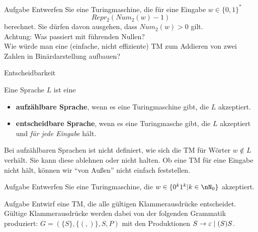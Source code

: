 \begin{frame}{Aufgabe}
	Entwerfen Sie eine Turingmaschine, die für eine Eingabe $w \in \{0, 1\}^*$ $$Repr_2(Num_2(w) - 1)$$ berechnet. Sie dürfen davon ausgehen, dass $Num_2(w) > 0$ gilt.\\
	\pause
	Achtung: Was passiert mit führenden Nullen?\\
	
	\bigskip
	Wie würde man eine (einfache, nicht effiziente) TM zum Addieren von zwei Zahlen in Binärdarstellung aufbauen?
\end{frame}


\begin{frame}{Entscheidbarkeit}
	\begin{Definition}
		Eine Sprache $L$ ist eine   
		\begin{itemize}[<+->]
			\item \textbf{aufzählbare Sprache}, wenn es eine Turingmaschine gibt, die $L$ akzeptiert.
			\item \textbf{entscheidbare Sprache}, wenn es eine Turingmasche gibt, die $L$ akzeptiert und \emph{für jede Eingabe} hält.
		\end{itemize}
	\end{Definition} \pause
	
	Bei aufzählbaren Sprachen ist nicht definiert, wie sich die TM für Wörter $ w \notin L$ verhält. Sie kann diese ablehnen oder nicht halten. Ob eine TM für eine Eingabe nicht hält, können wir \enquote{von Außen} nicht einfach feststellen.
\end{frame}


\begin{frame}{Aufgabe}
	Entwerfen Sie eine Turingmaschine, die $w\in \{0^k1^k | k\in \nN_0 \} $ akzeptiert. 
\end{frame}

\begin{frame}{Aufgabe}
	Entwirf eine TM, die alle gültigen Klammerausdrücke entscheidet.\\
	Gültige Klammerausdrücke werden dabei von der folgenden Grammatik produziert: $ G = (\{S\},\{(, )\}, S, P )$ mit den Produktionen $ S \to \varepsilon \mid (S)S$.
\end{frame}
